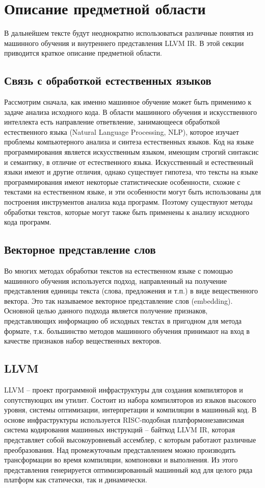 \section{Описание предметной области}
В дальнейшем тексте будут неоднократно использоваться различные понятия из машинного обучения и внутреннего представления LLVM IR. В этой секции приводится краткое описание предметной области.

\subsection{Связь с обработкой естественных языков}
Рассмотрим сначала, как именно машинное обучение может быть применимо к задаче анализа исходного кода. В области машинного обучения и искусственного интеллекта есть направление ответвление, занимающееся обработкой естественного языка (Natural Language Processing, NLP), которое изучает проблемы компьютерного анализа и синтеза естественных языков. Код на языке программирования является искусственным языком, имеющим строгий синтаксис и семантику, в отличие от естественного языка. Искусственный и естественный языки имеют и другие отличия, однако существует гипотеза, что тексты на языке программирования имеют некоторые статистические особенности, схожие с текстами на естественном языке, и эти особенности могут быть использованы для построения инструментов анализа кода программ. Поэтому существуют методы обработки текстов, которые могут также быть применены к анализу исходного кода программ. 

\subsection{Векторное представление слов}
Во многих методах обработки текстов на естественном языке с помощью машинного обучения используется подход, направленный на получение представления единицы текста (слова, предложения и т.п.) в виде вещественного вектора. Это так называемое векторное представление слов (embedding). Основной целью данного подхода является получение признаков, представляющих информацию об исходных текстах в пригодном для метода формате, т.к. большинство методов машинного обучения принимают на вход в качестве признаков набор вещественных векторов.

\subsection{LLVM}
LLVM\cite{Lattner:MSThesis02} -- проект программной инфраструктуры для создания компиляторов и сопутствующих им утилит. Состоит из набора компиляторов из языков высокого уровня, системы оптимизации, интерпретации и компиляции в машинный код. В основе инфраструктуры используется RISC-подобная платформонезависимая система кодирования машинных инструкций -- байткод LLVM IR, которая представляет собой высокоуровневый ассемблер, с которым работают различные преобразования. Над промежуточным представлением можно производить трансформации во время компиляции, компоновки и выполнения. Из этого представления генерируется оптимизированный машинный код для целого ряда платформ как статически, так и динамически.

